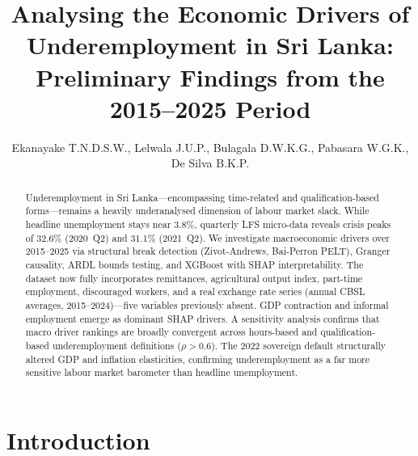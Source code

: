 \documentclass[sigconf]{acmart}
\begin{document}
\title{Analysing the Economic Drivers of Underemployment in Sri Lanka: Preliminary Findings from the 2015--2025 Period}


\author{
Ekanayake T.N.D.S.W.,
Lelwala J.U.P.,
Bulagala D.W.K.G.,
Pabasara W.G.K.,
De Silva B.K.P.
}



\begin{abstract}
Underemployment in Sri Lanka---encompassing time-related and
qualification-based forms---remains a heavily underanalysed dimension of
labour market slack. While headline unemployment stays near 3.8\%, quarterly
LFS micro-data reveals crisis peaks of 32.6\% (2020~Q2) and 31.1\%
(2021~Q2). We investigate macroeconomic drivers over 2015--2025 via
structural break detection (Zivot-Andrews, Bai-Perron PELT), Granger
causality, ARDL bounds testing, and XGBoost with SHAP interpretability.
The dataset now fully incorporates remittances, agricultural output index,
part-time employment, discouraged workers, and a real exchange rate series
(annual CBSL averages, 2015--2024)---five variables previously absent.
GDP contraction and informal employment emerge as dominant SHAP drivers.
A sensitivity analysis confirms that macro driver rankings are broadly
convergent across hours-based and qualification-based underemployment
definitions ($\rho{>}0.6$). The 2022 sovereign default structurally altered
GDP and inflation elasticities, confirming underemployment as a far more
sensitive labour market barometer than headline unemployment.
\end{abstract}


\maketitle

\section{Introduction}
\end{document}
